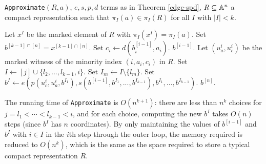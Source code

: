 \documentclass[letterpaper,11pt]{article}
\DeclareMathOperator{\Sg}{Sg}
\DeclareMathOperator{\Sig}{Sig}
\begin{document}

\begin{algorithm}
\caption{\texttt{Approximate}$(R, a)$, $e,s,p,d$ terms as in Theorem \ref{edge-spd}, $R \subseteq \mathbb{A}^n$ a compact representation such that $\pi_I(a) \in \pi_I(R)$ for all $I$ with $|I| < k$.}
\begin{algorithmic}[1]
\State Let $x^I$ be the marked element of $R$ with $\pi_I(x^I) = \pi_I(a)$.
\EndFor
\State Set $b^{[k-1]\cap[n]} = x^{[k-1]\cap[n]}$.
\State Set $c_i \gets d(b^{[i-1]}_i,a_i)$.
\If{$(i,a_i,c_i) \not\in \Sig(R)$}
\State \Return $b^{[i-1]}$.
\Else
\State Let $(u^i_a,u^i_c)$ be the marked witness of the minority index $(i,a_i,c_i)$ in $R$.
\EndIf
{}
\State Set $I \gets [j] \cup \{l_2, ..., l_{k-1}, i\}$.
\State Set $I_m \gets I\setminus \{l_m\}$.
\EndFor
\State Set $b^I \gets e(p(u^i_c,u^i_a,b^{I_1}),s(b^{[i-1]},b^{I_1},...,b^{I_{k-1}}),b^{I_1},...,b^{I_{k-1}})$.
\EndFor
\EndFor
\EndFor
\State \Return $b^{[n]}$.
\end{algorithmic}
\end{algorithm}

The running time of \texttt{Approximate} is $O(n^{k+1})$: there are less than $n^k$ choices for $j = l_1 < \cdots < l_{k-1} < i$, and for each choice, computing the new $b^I$ takes $O(n)$ steps (since $b^I$ has $n$ coordinates). By only maintaining the values of $b^{[i-1]}$ and $b^I$ with $i \in I$ in the $i$th step through the outer loop, the memory required is reduced to $O(n^k)$, which is the same as the space required to store a typical compact representation $R$.
\end{document}
